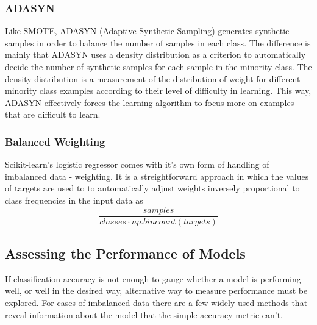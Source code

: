 \subsubsection{ADASYN}
Like SMOTE, ADASYN (Adaptive Synthetic Sampling) generates synthetic samples
in order to balance the number of samples in each class. The difference is
mainly that ADASYN uses a density distribution as a criterion to automatically 
decide the number of synthetic samples for each sample in the minority class.
The density distribution is a measurement of the distribution of weight for 
different minority class examples according to their level of difficulty in
learning. This way, ADASYN effectively forces the learning algorithm to 
focus more on examples that are difficult to learn.

\subsubsection{Balanced Weighting}
Scikit-learn's logistic regressor comes with it's own form of handling of
imbalanced data - weighting. It is a streightforward approach in which 
the values of targets are used to to automatically adjust weights inversely 
proportional to class frequencies in the input data as 
$$\frac{samples}{classes \cdot np.bincount(targets)}$$

\subsection{Assessing the Performance of Models}
If classification accuracy is not enough to gauge whether a model is
performing well, or well in the desired way, alternative way to measure
performance must be explored. For cases of imbalanced data there are a few
widely used methods that reveal information about the model that the simple
accuracy metric can't.

